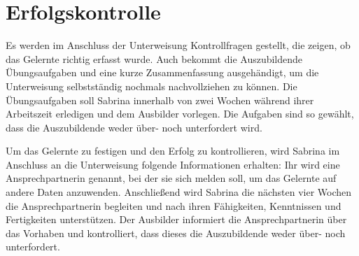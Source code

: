 \section{Erfolgskontrolle}\label{kap3:erfolg}
Es werden im Anschluss der Unterweisung Kontrollfragen gestellt, die zeigen, ob das Gelernte richtig erfasst wurde. Auch bekommt die Auszubildende Übungsaufgaben und eine kurze Zusammenfassung ausgehändigt, um die Unterweisung selbstständig nochmals nachvollziehen zu können. Die Übungsaufgaben soll Sabrina innerhalb von zwei Wochen während ihrer Arbeitszeit erledigen und dem Ausbilder vorlegen. Die Aufgaben sind so gewählt, dass die Auszubildende weder über- noch unterfordert wird.
\par
Um das Gelernte zu festigen und den Erfolg zu kontrollieren, wird Sabrina im Anschluss an die Unterweisung folgende Informationen erhalten: Ihr wird eine Ansprechpartnerin genannt, bei der sie sich melden soll, um das Gelernte auf andere Daten anzuwenden. Anschließend wird Sabrina die nächsten vier Wochen die Ansprechpartnerin begleiten und nach ihren Fähigkeiten, Kenntnissen und Fertigkeiten unterstützen. Der Ausbilder informiert die Ansprechpartnerin über das Vorhaben und kontrolliert, dass dieses die Auszubildende weder über- noch unterfordert. 


